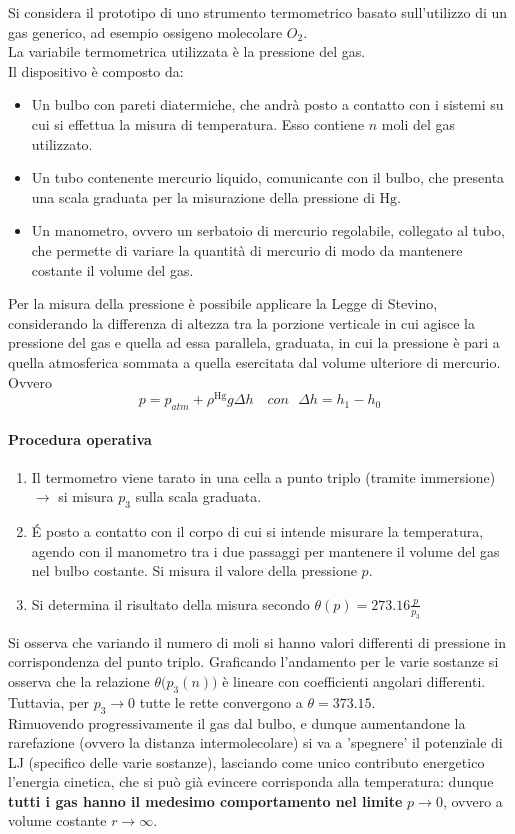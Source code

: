 \documentclass[10pt, oneside]{book}
\begin{document}
Si considera il prototipo di uno strumento termometrico basato sull'utilizzo di un gas generico, ad esempio ossigeno molecolare $O_2$.\\
La variabile termometrica utilizzata è la pressione del gas.\\
Il dispositivo è composto da:
\begin{itemize}
\item Un bulbo con pareti diatermiche, che andrà posto a contatto con i sistemi su cui si effettua la misura di temperatura. Esso contiene $n$ moli del gas utilizzato.
\item Un tubo contenente mercurio liquido, comunicante con il bulbo, che presenta una scala graduata per la misurazione della pressione di $\mathrm{Hg}$. 
\item Un manometro, ovvero un serbatoio di mercurio regolabile, collegato al tubo, che permette di variare la quantità di mercurio di modo da mantenere costante il volume del gas.
\end{itemize}
Per la misura della pressione è possibile applicare la Legge di Stevino, considerando la differenza di altezza tra la porzione verticale in cui agisce la pressione del gas e quella ad essa parallela, graduata, in cui la pressione è pari a quella atmosferica sommata a quella esercitata dal volume ulteriore di mercurio. Ovvero
\[p = p_{atm} + \rho^{\mathrm{Hg}} g\Delta h \quad con \enspace \, \Delta h = h_1 - h_0\]

\paragraph{Procedura operativa}
\begin{enumerate}
\item Il termometro viene tarato in una cella a punto triplo (tramite immersione) $\rightarrow$ si misura $p_3$ sulla scala graduata.
\item \'E posto a contatto con il corpo di cui si intende misurare la temperatura, agendo con il manometro tra i due passaggi per mantenere il volume del gas nel bulbo costante. Si misura il valore della pressione $p$.
\item Si determina il risultato della misura secondo $\displaystyle \theta(p) = 273.16 \frac{p}{p_3}$
\end{enumerate}
Si osserva che variando il numero di moli si hanno valori differenti di pressione in corrispondenza del punto triplo. Graficando l'andamento per le varie sostanze si osserva che la relazione $\theta\big(p_3(n)\big)$ è lineare con coefficienti angolari differenti. Tuttavia, per $p_3 \rightarrow 0$ tutte le rette convergono a $\theta = 373.15$.
\\Rimuovendo progressivamente il gas dal bulbo, e dunque aumentandone la rarefazione (ovvero la distanza intermolecolare) si va a 'spegnere' il potenziale di LJ (specifico delle varie sostanze), lasciando come unico contributo energetico l'energia cinetica, che si può già evincere corrisponda alla temperatura: dunque \textbf{tutti i gas hanno il medesimo comportamento nel limite} $p 	\rightarrow 0$, ovvero a volume costante $r \rightarrow \infty$.
\end{document}
